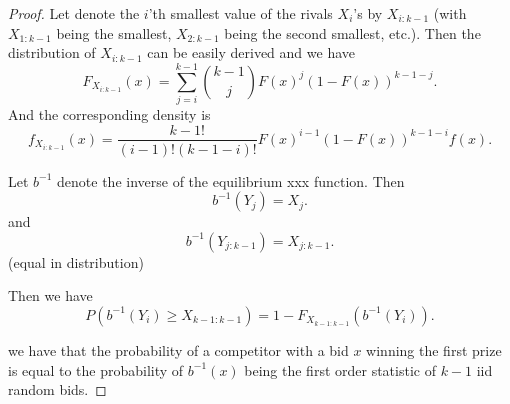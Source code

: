 \documentclass[11pt]{article}
\begin{document}
\begin{proof}
Let denote the $i$'th smallest value of the rivals $X_i$'s by $X_{i:k-1}$ (with $X_{1:k-1}$ being the smallest, $X_{2:k-1}$ being the second smallest, etc.). Then the distribution of $X_{i:k-1}$ can be easily derived \citep{arnold2012relations} and we have
\begin{equation}
  F_{X_{i:k-1}} (x) = \sum_{j=i}^{k-1} \binom{k-1}{j} F(x)^j (1-F(x))^{k-1-j}.
\end{equation}
And the corresponding density is
\begin{equation}
  f_{X_{i:k-1}} (x) = \frac{k-1!}{(i-1)!(k-1-i)!} F(x)^{i-1} (1-F(x))^{k-1-i} f(x). 
\end{equation}

Let $b^{-1}$ denote the inverse of the equilibrium xxx function. Then 
\begin{equation}
  b^{-1}(Y_j) =X_j. 
\end{equation}
and 
\begin{equation}
  b^{-1}(Y_{j:k-1}) =X_{j:k-1}. 
\end{equation}
(equal in distribution)

Then we have
\begin{equation}
  P(b^{-1}(Y_i) \geq X_{k-1:k-1})  = 1 - F_{X_{k-1:k-1}}(b^{-1}(Y_i)) .
\end{equation}

 we have that the probability of a competitor with a bid $x$ winning the first prize is equal to the probability of $b^{-1}(x)$ being the first order statistic of $k-1$ iid random bids.  


\end{proof}
\end{document}
